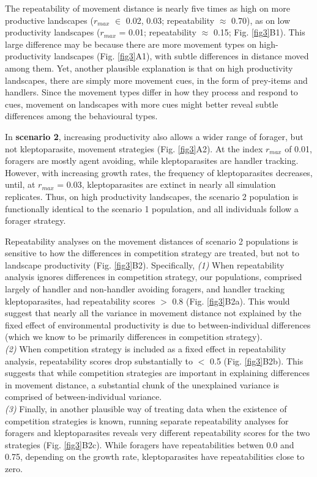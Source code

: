     The repeatability of movement distance is nearly five times as high on more productive landscapes ($r_{max}$ $\in$ 0.02, 0.03; repeatability $\approx$ 0.70), as on low productivity landscapes ($r_{max}$ = 0.01; repeatability $\approx$ 0.15; Fig. \ref{fig3}B1).
    This large difference may be because there are more movement types on high-productivity landscapes (Fig. \ref{fig3}A1), with subtle differences in distance moved among them.
    Yet, another plausible explanation is that on high productivity landscapes, there are simply more movement cues, in the form of prey-items and handlers.
    Since the movement types differ in how they process and respond to cues, movement on landscapes with more cues might better reveal subtle differences among the behavioural types.
    
    In \textbf{scenario 2}, increasing productivity also allows a wider range of forager, but not kleptoparasite, movement strategies (Fig. \ref{fig3}A2).
    At the index $r_{max}$ of 0.01, foragers are mostly agent avoiding, while kleptoparasites are handler tracking.
    However, with increasing growth rates, the frequency of kleptoparasites decreases, until, at $r_{max}$ = 0.03, kleptoparasites are extinct in nearly all simulation replicates.
    Thus, on high productivity landscapes, the scenario 2 population is functionally identical to the scenario 1 population, and all individuals follow a forager strategy.
    
    Repeatability analyses on the movement distances of scenario 2 populations is sensitive to how the differences in competition strategy are treated, but not to landscape productivity (Fig. \ref{fig3}B2). Specifically,
    \textit{(1)} When repeatability analysis ignores differences in competition strategy, our populations, comprised largely of handler and non-handler avoiding foragers, and handler tracking kleptoparasites, had repeatability scores $>$ 0.8 (Fig. \ref{fig3}B2a).
    This would suggest that nearly all the variance in movement distance not explained by the fixed effect of environmental productivity is due to between-individual differences (which we know to be primarily differences in competition strategy).\\
    \textit{(2)} When competition strategy is included as a fixed effect in repeatability analysis, repeatability scores drop substantially to $<$ 0.5 (Fig. \ref{fig3}B2b).
    This suggests that while competition strategies are important in explaining differences in movement distance, a substantial chunk of the unexplained variance is comprised of between-individual variance.\\ 
    \textit{(3)} Finally, in another plausible way of treating data when the existence of competition strategies is known, running separate repeatability analyses for foragers and kleptoparasites reveals very different repeatability scores for the two strategies (Fig. \ref{fig3}B2c).
    While foragers have repeatabilities betwen 0.0 and 0.75, depending on the growth rate, kleptoparasites have repeatabilities close to zero.
    
